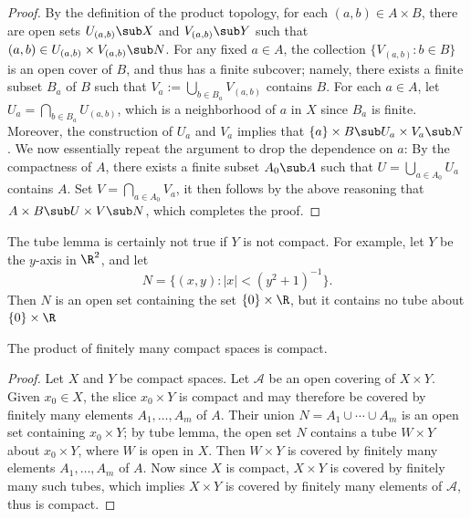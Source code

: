 \begin{proof}
By the definition of the product topology, for each $(a,b)\in A\times B$, there are open sets $U_{(a,b)}\sub X$ and $V_{(a,b)}\sub Y$ such that $(a,b)\in U_{(a,b)}\times V_{(a,b)}\sub N$. For any fixed $a\in A$, the collection $\{V_{(a,b)}:b\in B\}$ is an open cover of $B$, and thus has a finite subcover; namely, there exists a finite subset $B_a$ of $B$ such that $V_a:=\bigcup_{b\in B_a}V_{(a,b)}$ contains $B$. For each $a\in A$, let $U_a=\bigcap_{b\in B_a}U_{(a,b)}$, which is a neighborhood of $a$ in $X$ since $B_a$ is finite. Moreover, the construction of $U_a$ and $V_a$ implies that $\{a\}\times B\sub U_a\times V_a\sub N$. We now essentially repeat the argument to drop the dependence on $a$: By the compactness of $A$, there exists a finite subset $A_0\sub A$ such that $U=\bigcup_{a\in A_0}U_a$ contains $A$. Set $V=\bigcap_{a\in A_0}V_a$, it then follows by the above reasoning that $A\times B\sub U\times V\sub N$, which completes the proof.
\end{proof}
\begin{example}
The tube lemma is certainly not true if $Y$ is not compact. For example, let $Y$ be the $y$-axis in $\R^2$, and let
\[N=\{(x,y):|x|<(y^2+1)^{-1}\}.\]
Then $N$ is an open set containing the set $\{0\}\times\R$, but it contains no tube about $\{0\}\times\R$
\end{example}
\begin{theorem}
The product of finitely many compact spaces is compact.
\end{theorem}
\begin{proof}
Let $X$ and $Y$ be compact spaces. Let $\mathcal{A}$ be an open covering of $X\times Y$. Given $x_0\in X$, the slice $x_0\times Y$ is compact and may therefore be covered by finitely many elements $A_1,\dots,A_m$ of $A$. Their union $N=A_1\cup\cdots\cup A_m$ is an open set containing $x_0\times Y$; by tube lemma, the open set $N$ contains a tube $W\times Y$ about $x_0\times Y$, where $W$ is open in $X$. Then $W\times Y$ is covered by finitely many elements $A_1,\dots,A_m$ of $A$. Now since $X$ is compact, $X\times Y$ is covered by finitely many such tubes, which implies $X\times Y$ is covered by finitely many elements of $\mathcal{A}$, thus is compact.
\end{proof}

